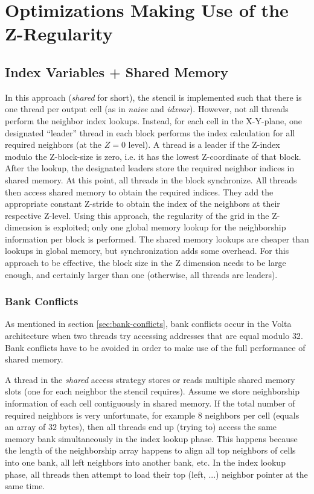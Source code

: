 \section{Optimizations Making Use of the Z-Regularity}

\subsection{Index Variables + Shared Memory} In this approach (\emph{shared} for short), the stencil is implemented such that there is one thread per output cell (as in \emph{naive} and \emph{idxvar}). However, not all threads perform the neighbor index lookups. Instead, for each cell in the X-Y-plane, one designated ``leader'' thread in each block performs the index calculation for all required neighbors (at the $Z=0$ level). A thread is a leader if the Z-index modulo the Z-block-size is zero, i.e. it has the lowest Z-coordinate of that block. After the lookup, the designated leaders store the required neighbor indices in shared memory.  At this point, all threads in the block synchronize. All threads then access shared memory to obtain the required indices. They add the appropriate constant Z-stride to obtain the index of the neighbors at their respective Z-level. Using this approach, the regularity of the grid in the Z-dimension is exploited; only one global memory lookup for the neighborship information per block is performed. The shared memory lookups are cheaper than lookups in global memory, but synchronization adds some overhead. For this approach to be effective, the block size in the Z dimension needs to be large enough, and certainly larger than one (otherwise, all threads are leaders).

\subsubsection{Bank Conflicts}

As mentioned in section \ref{sec:bank-conflicts}, bank conflicts occur in the Volta architecture when two threads try accessing addresses that are equal modulo $32$. Bank conflicts have to be avoided in order to make use of the full performance of shared memory.

A thread in the \emph{shared} access strategy stores or reads multiple shared memory slots (one for each neighbor the stencil requires). Assume we store neighborship information of each cell contiguously in shared memory. If the total number of required neighbors is very unfortunate, for example $8$ neighbors per cell (equals an array of $32$ bytes), then all threads end up (trying to) access the same memory bank simultaneously in the index lookup phase. This happens because the length of the neighborship array happens to align all top neighbors of cells into one bank, all left neighbors into another bank, etc. In the index lookup phase, all threads then attempt to load their top (left, ...) neighbor pointer at the same time.

